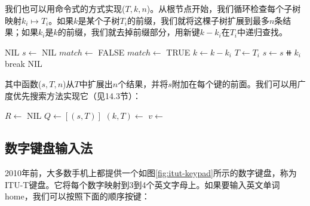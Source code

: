 \documentclass[b5paper]{ctexart}
\begin{document}
我们也可以用命令式的方式实现($T, k, n$)。从根节点开始，我们循环检查每个子树映射$k_i \mapsto T_i$。如果$k$是某个子树$T_i$的前缀，我们就将这棵子树扩展到最多$n$条结果；如果$k_i$是$k$的前缀，我们就去掉前缀部分，用新键$k - k_i$在$T_i$中递归查找。

\begin{algorithmic}[1]
     \State \Return NIL
  \EndIf
  \State $s \gets$ NIL
  \Repeat
    \State $match \gets$ FALSE
        \State \Return {}
      \EndIf
        \State $match \gets$ TRUE
        \State $k \gets k - k_i$  
        \State $T \gets T_i$
        \State $s \gets s \doubleplus k_i$
        \State break
      \EndIf
    \EndFor
  \State \Return NIL
\EndFunction
\end{algorithmic}

其中函数($s, T, n$)从$T$中扩展出$n$个结果，并将$s$附加在每个键的前面。我们可以用广度优先搜索方法实现它（见14.3节）：

\begin{algorithmic}[1]
  \State $R \gets $ NIL
  \State $Q \gets [(s, T)]$
    \State $(k, T) \gets$ 
    \State $v \gets$ 
      \State {}
    \EndIf
      \State {}
    \EndFor
  \EndWhile
\EndFunction
\end{algorithmic}


\subsection{数字键盘输入法}

2010年前，大多数手机上都提供一个如图\ref{fig:itut-keypad}所示的数字键盘，称为ITU-T键盘。它将每个数字映射到3到4个英文字母上。如果要输入英文单词home，我们可以按照下面的顺序按键：
\end{document}
